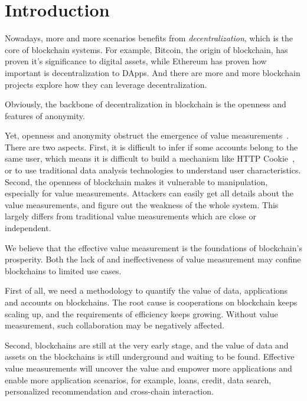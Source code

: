 
\section{Introduction}

Nowadays, more and more scenarios benefits from \emph{decentralization}, which
is the core of blockchain systems. For example, Bitcoin, the origin of
blockchain, has proven it's significance to digital assets, while Ethereum has
proven how important is decentralization to DApps. And there are more and more
blockchain projects explore how they can leverage decentralization.

Obviously, the backbone of decentralization in blockchain is the openness and features of anonymity.


Yet, openness and anonymity obstruct the emergence of value
measurements~\cite{meiklejohn2013fistful}. There are two aspects. First, it is
difficult to infer if some accounts belong to the same user, which means it is
difficult to build a mechanism like HTTP Cookie~\cite{Cookie}, or to use 
traditional data analysis technologies to understand user characteristics.
Second, the openness of blockchain makes it vulnerable to manipulation,
especially for value measurements. Attackers can easily get all details about the
value measurements, and figure out the weakness of the whole system. This
largely differs from traditional value measurements which are close or
independent.

We believe that the effective value measurement is the foundations of
blockchain's prosperity. Both the lack of and ineffectiveness of value measurement may confine blockchains to limited use cases.

First of all, we need a methodology to quantify the value of data,
applications and accounts on blockchains. The root cause is cooperations on
blockchain keeps scaling up, and the requirements of efficiency
keeps growing. Without value measurement, such collaboration may be negatively affected.

Second, blockchains are still at the very early stage, and the value of data
and assets on the blockchains is still underground and waiting to be found.
Effective value measurements will uncover the value and empower more applications and enable more application scenarios, for example, loans, credit, data search, personalized recommendation and cross-chain interaction.

